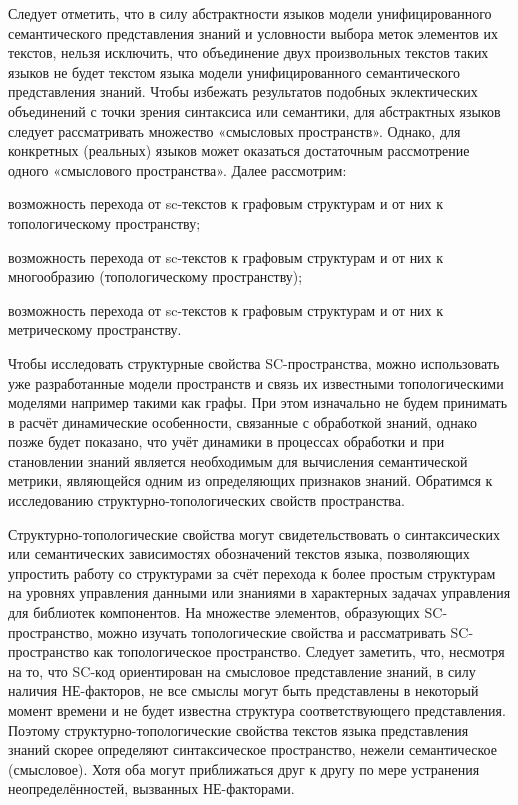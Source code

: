 Следует отметить, что в силу абстрактности языков модели унифицированного семантического представления знаний и условности выбора меток элементов их текстов, нельзя исключить, что объединение двух произвольных текстов таких языков не будет текстом языка модели унифицированного семантического представления знаний. Чтобы избежать результатов подобных эклектических объединений с точки зрения синтаксиса или семантики, для абстрактных языков следует рассматривать множество «смысловых пространств». Однако, для конкретных (реальных) языков может оказаться достаточным рассмотрение одного «смыслового пространства».
Далее рассмотрим:

\begin{textitemize}
	\item возможность перехода от sc-текстов к графовым структурам и от них к топологическому пространству;
	\item возможность перехода от sc-текстов к графовым структурам и от них к многообразию (топологическому пространству);
	\item возможность перехода от sc-текстов к графовым структурам и от них к метрическому пространству.
\end{textitemize}

Чтобы исследовать структурные свойства SC-пространства, можно использовать уже разработанные модели пространств и связь их известными топологическими моделями например такими как графы. При этом изначально не будем принимать в расчёт динамические особенности, связанные с обработкой знаний, однако позже будет показано, что учёт динамики в процессах обработки и при становлении знаний является необходимым для вычисления семантической метрики, являющейся одним из определяющих признаков знаний.
Обратимся к исследованию структурно-топологических свойств пространства.

Структурно-топологические свойства могут свидетельствовать о синтаксических или семантических зависимостях обозначений текстов языка, позволяющих упростить работу со структурами за счёт перехода к более простым структурам на уровнях управления данными или знаниями в характерных задачах управления для библиотек компонентов.
На множестве элементов, образующих SC-пространство, можно изучать топологические свойства и рассматривать SC-пространство как топологическое пространство. Следует заметить, что, несмотря на то, что SC-код ориентирован на смысловое представление знаний, в силу наличия НЕ-факторов, не все смыслы могут быть представлены в некоторый момент времени и не будет известна структура соответствующего представления. Поэтому структурно-топологические свойства текстов языка представления знаний скорее определяют синтаксическое пространство, нежели семантическое (смысловое). Хотя оба могут приближаться друг к другу по мере устранения неопределённостей, вызванных НЕ-факторами.

